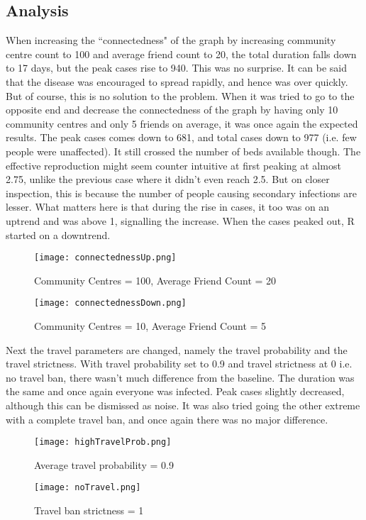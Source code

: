 \documentclass[conference]{IEEEtran}
\begin{document}
        \subsection{Analysis}
            When increasing the ``connectedness" of the graph by increasing community centre count to 100 and average friend count to 20, the total duration falls down to 17 days, but the peak cases rise to 940. This was no surprise. It can be said that the disease was encouraged to spread rapidly, and hence was over quickly. But of course, this is no solution to the problem. When it was tried to go to the opposite end and decrease the connectedness of the graph by having only 10 community centres and only 5 friends on average, it was once again the expected results. The peak cases comes down to 681, and total cases down to 977 (i.e. few people were unaffected). It still crossed the number of beds available though. The effective reproduction might seem counter intuitive at first peaking at almost 2.75, unlike the previous case where it didn't even reach 2.5. But on closer inspection, this is because the number of people causing secondary infections are lesser. What matters here is that during the rise in cases, it too was on an uptrend and was above 1, signalling the increase. When the cases peaked out, R started on a downtrend.
            \begin{figure}[!h]
        		\texttt{[image: connectednessUp.png]}
        		\caption{Community Centres = 100, Average Friend Count = 20}
            \end{figure}
            \begin{figure}[!htb]
        		\texttt{[image: connectednessDown.png]}
        		\caption{Community Centres = 10, Average Friend Count = 5}
            \end{figure}
            \newpage
            Next the travel parameters are changed, namely the travel probability and the travel strictness. With travel probability set to 0.9 and travel strictness at 0 i.e. no travel ban, there wasn't much difference from the baseline. The duration was the same and once again everyone was infected. Peak cases slightly decreased, although this can be dismissed as noise. It was also tried going the other extreme with a complete travel ban, and once again there was no major difference.
             \begin{figure}[!htb]
        		\texttt{[image: highTravelProb.png]}
        		\caption{Average travel probability = 0.9}
            \end{figure}
            \begin{figure}[!htb]
        		\texttt{[image: noTravel.png]}
        		\caption{Travel ban strictness = 1}
            \end{figure}
            
\end{document}
